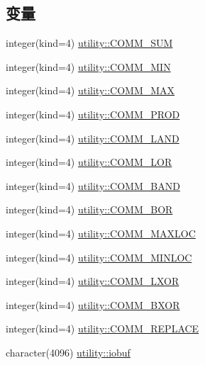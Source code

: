 \subsection*{变量}
\begin{DoxyCompactItemize}
\item 
integer(kind=4) \hyperlink{namespaceutility_ab4f4798be78a04776caf765b9649fb40}{utility::COMM\_\-SUM}
\item 
integer(kind=4) \hyperlink{namespaceutility_ac9e4f475384ab10881241a6d94926686}{utility::COMM\_\-MIN}
\item 
integer(kind=4) \hyperlink{namespaceutility_aa047c79aef63ff154b0eac44ec8e78c7}{utility::COMM\_\-MAX}
\item 
integer(kind=4) \hyperlink{namespaceutility_ac007ebc5ff080707309b709eaf627c4f}{utility::COMM\_\-PROD}
\item 
integer(kind=4) \hyperlink{namespaceutility_a9f57cfbd8fe711ae3aa4fd939befe32d}{utility::COMM\_\-LAND}
\item 
integer(kind=4) \hyperlink{namespaceutility_a84fc0cdbf8b54f2cff80170d1dd375b5}{utility::COMM\_\-LOR}
\item 
integer(kind=4) \hyperlink{namespaceutility_ad6a4a4dc93ce4c7954383fd79547415e}{utility::COMM\_\-BAND}
\item 
integer(kind=4) \hyperlink{namespaceutility_a571a1353450878c872ab821842c903bb}{utility::COMM\_\-BOR}
\item 
integer(kind=4) \hyperlink{namespaceutility_a64b1d9ff2637bcfc6c7a8a6a4373b45e}{utility::COMM\_\-MAXLOC}
\item 
integer(kind=4) \hyperlink{namespaceutility_ae670c852884473e9ff57f5184c19a844}{utility::COMM\_\-MINLOC}
\item 
integer(kind=4) \hyperlink{namespaceutility_a8bfb05876a1579246420ebf616f24e12}{utility::COMM\_\-LXOR}
\item 
integer(kind=4) \hyperlink{namespaceutility_a1738a7d6502f88e9dc6b93be81f43faf}{utility::COMM\_\-BXOR}
\item 
integer(kind=4) \hyperlink{namespaceutility_a0774c1eca038528c11297ffd22bbbfaa}{utility::COMM\_\-REPLACE}
\item 
character(4096) \hyperlink{namespaceutility_a3003cfe86f93564a5c4458faa6c5124f}{utility::iobuf}
\end{DoxyCompactItemize}
